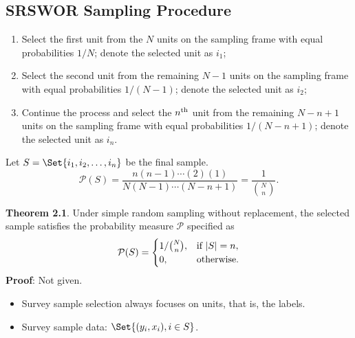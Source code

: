 \subsection*{SRSWOR Sampling Procedure}
\begin{Regular}{}
    \begin{enumerate}[(1)]
        \item Select the first unit from the $N$ units on the sampling frame with
              equal probabilities $1/N$; denote the selected unit as $i_1$;
        \item Select the second unit from the remaining $ N-1 $ units on the
              sampling frame with equal probabilities $ 1/(N-1) $; denote the
              selected unit as $i_2$;
        \item Continue the process and select the $n\textsuperscript{th}$ unit from the remaining
              $ N-n+1 $ units on the sampling frame with equal probabilities
              $ 1/(N-n+1) $; denote the selected unit as $ i_n $.
    \end{enumerate}
\end{Regular}
Let $ S=\Set{i_1,i_2,\ldots,i_n} $ be the final sample.
\[ \mathcal{P}(S)=\frac{n(n-1)\cdots(2)(1)}{N(N-1)\cdots(N-n+1)}=\frac{1}{\binom{N}{n}}. \]
\begin{Result}{}
    \textbf{Theorem 2.1}. Under simple random sampling without replacement,
    the selected sample satisfies the probability measure $ \mathcal{P} $ specified as
    \[ \mathcal{P}(S)=\begin{cases}
            1/\binom{N}{n}, & \text{if $ \lvert S\rvert=n $}, \\
            0,              & \text{otherwise}.
        \end{cases} \]
    \tcblower{}
    \textbf{Proof}: Not given.
\end{Result}
\begin{itemize}
    \item Survey sample selection always focuses on units, that is, the labels.
    \item Survey sample data: $ \Set{(y_i,x_i),i\in S} $.
\end{itemize}
